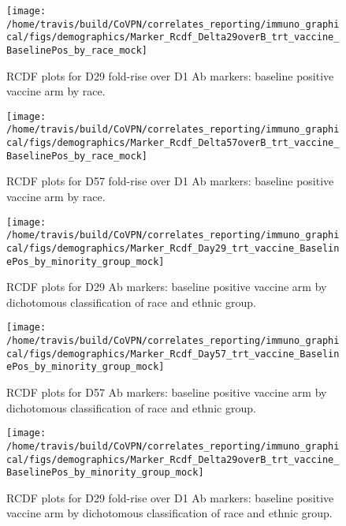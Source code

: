 \documentclass[]{book}
\theoremstyle{definition}
\theoremstyle{definition}
\theoremstyle{definition}
\newcommand{\1}{\mathbbm{1}}
\begin{document}
\begin{figure}[H]

{\centering \texttt{[image: /home/travis/build/CoVPN/correlates\_reporting/immuno\_graphical/figs/demographics/Marker\_Rcdf\_Delta29overB\_trt\_vaccine\_BaselinePos\_by\_race\_mock]} 

}

\caption{RCDF plots for D29 fold-rise over D1 Ab markers: baseline positive vaccine arm by race.}\label{fig:unnamed-chunk-118}
\end{figure}

\begin{figure}[H]

{\centering \texttt{[image: /home/travis/build/CoVPN/correlates\_reporting/immuno\_graphical/figs/demographics/Marker\_Rcdf\_Delta57overB\_trt\_vaccine\_BaselinePos\_by\_race\_mock]} 

}

\caption{RCDF plots for D57 fold-rise over D1 Ab markers: baseline positive vaccine arm by race.}\label{fig:unnamed-chunk-119}
\end{figure}

\begin{figure}[H]

{\centering \texttt{[image: /home/travis/build/CoVPN/correlates\_reporting/immuno\_graphical/figs/demographics/Marker\_Rcdf\_Day29\_trt\_vaccine\_BaselinePos\_by\_minority\_group\_mock]} 

}

\caption{RCDF plots for D29 Ab markers: baseline positive vaccine arm by dichotomous classification of race and ethnic group.}\label{fig:unnamed-chunk-120}
\end{figure}

\begin{figure}[H]

{\centering \texttt{[image: /home/travis/build/CoVPN/correlates\_reporting/immuno\_graphical/figs/demographics/Marker\_Rcdf\_Day57\_trt\_vaccine\_BaselinePos\_by\_minority\_group\_mock]} 

}

\caption{RCDF plots for D57 Ab markers: baseline positive vaccine arm by dichotomous classification of race and ethnic group.}\label{fig:unnamed-chunk-121}
\end{figure}

\begin{figure}[H]

{\centering \texttt{[image: /home/travis/build/CoVPN/correlates\_reporting/immuno\_graphical/figs/demographics/Marker\_Rcdf\_Delta29overB\_trt\_vaccine\_BaselinePos\_by\_minority\_group\_mock]} 

}

\caption{RCDF plots for D29 fold-rise over D1 Ab markers: baseline positive vaccine arm by dichotomous classification of race and ethnic group.}\label{fig:unnamed-chunk-122}
\end{figure}
\end{document}

